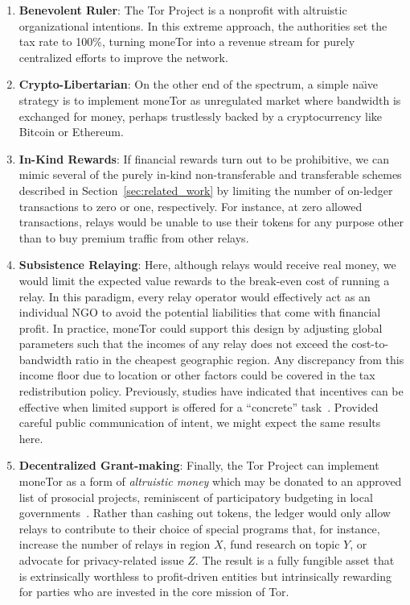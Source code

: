 \begin{enumerate}

\item \textbf{Benevolent Ruler}: The Tor Project is a nonprofit with altruistic organizational intentions.
  In this extreme approach, the authorities set the tax rate to 100\%, turning moneTor into a revenue stream for purely centralized efforts to improve the network.

\item \textbf{Crypto-Libertarian}: On the other end of the spectrum, a simple na\"{\i}ve strategy is to implement moneTor as unregulated market where bandwidth is exchanged for money, perhaps trustlessly backed by a cryptocurrency like Bitcoin or Ethereum.

\item \textbf{In-Kind Rewards}: If financial rewards turn out to be prohibitive, we can mimic several of the purely in-kind non-transferable and transferable schemes described in Section~\ref{sec:related_work} by limiting the number of on-ledger transactions to zero or one, respectively.
  For instance, at zero allowed transactions, relays would be unable to use their tokens for any purpose other than to buy premium traffic from other relays.

\item \textbf{Subsistence Relaying}: Here, although relays would receive real money, we would limit the expected value rewards to the break-even cost of running a relay.
In this paradigm, every relay operator would effectively act as an individual NGO to avoid the potential liabilities that come with financial profit.
In practice, moneTor could support this design by adjusting global parameters such that the incomes of any relay does not exceed the cost-to-bandwidth ratio in the cheapest geographic region.
Any discrepancy from this income floor due to location or other factors could be covered in the tax redistribution policy.
Previously, studies have indicated that incentives can be effective when limited support is offered for a ``concrete'' task~\cite{10.1257/jep.25.4.191, 10.1086/431263}.
Provided careful public communication of intent, we might expect the same results here.

\item \textbf{Decentralized Grant-making}: Finally, the Tor Project can implement moneTor as a form of \emph{altruistic money} which may be donated to an approved list of prosocial projects, reminiscent of participatory budgeting in local governments~\cite{cabannes2004participatory}.
Rather than cashing out tokens, the ledger would only allow relays to contribute to their choice of special programs that, for instance, increase the number of relays in region $X$, fund research on topic $Y$, or advocate for privacy-related issue $Z$.
The result is a fully fungible asset that is extrinsically worthless to profit-driven entities but intrinsically rewarding for parties who are invested in the core mission of Tor.

\end{enumerate}

